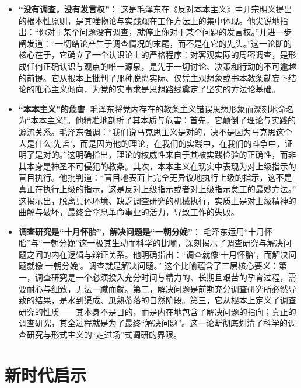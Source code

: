 \documentclass[a4paper,12pt]{article}
\begin{document}
\begin{itemize}
    \item \textbf{“没有调查，没有发言权”}：
这是毛泽东在《反对本本主义》中开宗明义提出的根本性原则，是其唯物论与实践观在工作方法上的集中体现。他尖锐地指出：“你对于某个问题没有调查，就停止你对于某个问题的发言权。”并进一步阐发道：“一切结论产生于调查情况的末尾，而不是在它的先头。”这一论断的核心在于，它确立了一个认识论上的严格程序：对客观实际的周密调查，是形成任何正确认识与观点的唯一源泉，是先于一切讨论、决策和行动的不可逾越的前提。它从根本上批判了那种脱离实际、仅凭主观想象或书本教条就妄下结论的唯心主义倾向，为党的实事求是思想路线奠定了坚实的方法论基础。
    \item \textbf{“本本主义”的危害}:
毛泽东将党内存在的教条主义错误思想形象而深刻地命名为“本本主义”。他精准地剖析了其本质与危害：首先，它颠倒了理论与实践的源流关系。毛泽东强调：“我们说马克思主义是对的，决不是因为马克思这个人是什么‘先哲’，而是因为他的理论，在我们的实践中，在我们的斗争中，证明了是对的。”这明确指出，理论的权威性来自于其被实践检验的正确性，而非其本身是神圣不可侵犯的教条。其次，本本主义在现实中表现为对上级指示的盲目执行。他批判道：“盲目地表面上完全无异议地执行上级的指示，这不是真正在执行上级的指示，这是反对上级指示或者对上级指示怠工的最妙方法。” 这揭示出，脱离具体环境、缺乏调查研究的机械执行，实质上是对上级精神的曲解与破坏，最终会窒息革命事业的活力，导致工作的失败。
    \item \textbf{调查研究是“十月怀胎”，解决问题是“一朝分娩”}：
毛泽东运用“十月怀胎”与“一朝分娩”这一极其生动而科学的比喻，深刻揭示了调查研究与解决问题之间的内在逻辑与辩证关系。他明确指出：“调查就像‘十月怀胎’，而解决问题就像‘一朝分娩’。调查就是解决问题。” 这个比喻蕴含了三层核心要义：第一，调查研究是一个必须投入充分时间与精力的、长期且艰苦的孕育过程，需要耐心与细致，无法一蹴而就。第二，解决问题是前期充分调查研究所必然导致的结果，是水到渠成、瓜熟蒂落的自然阶段。第三，它从根本上定义了调查研究的性质——其本身不是目的，而是内在地包含了解决问题的指向；真正的调查研究，其全过程就是为了最终“解决问题”。这一论断彻底划清了科学的调查研究与形式主义的“走过场”式调研的界限。
\end{itemize}
 

\section{新时代启示}
\end{document}
